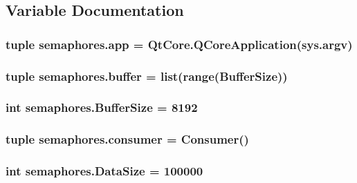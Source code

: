 \subsection{Variable Documentation}
\hypertarget{namespacesemaphores_a0b78d83b02c6f606584e20a9bfb91ddc}{}
\subsubsection[{app}]{\setlength{\rightskip}{0pt plus 5cm}tuple semaphores.\+app = Qt\+Core.\+Q\+Core\+Application(sys.\+argv)}\label{namespacesemaphores_a0b78d83b02c6f606584e20a9bfb91ddc}
\hypertarget{namespacesemaphores_a369f140580bf2673df41a072ca7833b2}{}
\subsubsection[{buffer}]{\setlength{\rightskip}{0pt plus 5cm}tuple semaphores.\+buffer = list({\bf range}({\bf Buffer\+Size}))}\label{namespacesemaphores_a369f140580bf2673df41a072ca7833b2}
\hypertarget{namespacesemaphores_a24fd80556c5528c81a40dd1db81a6acd}{}
\subsubsection[{Buffer\+Size}]{\setlength{\rightskip}{0pt plus 5cm}int semaphores.\+Buffer\+Size = 8192}\label{namespacesemaphores_a24fd80556c5528c81a40dd1db81a6acd}
\hypertarget{namespacesemaphores_a27596abab0131f27a9f3fa4ec522de31}{}
\subsubsection[{consumer}]{\setlength{\rightskip}{0pt plus 5cm}tuple semaphores.\+consumer = {\bf Consumer}()}\label{namespacesemaphores_a27596abab0131f27a9f3fa4ec522de31}
\hypertarget{namespacesemaphores_a5d7101533aa63ae91436bda1ada0f97f}{}
\subsubsection[{Data\+Size}]{\setlength{\rightskip}{0pt plus 5cm}int semaphores.\+Data\+Size = 100000}\label{namespacesemaphores_a5d7101533aa63ae91436bda1ada0f97f}
\hypertarget{namespacesemaphores_a00322f5648ba975dc23e9135233b5194}{}
